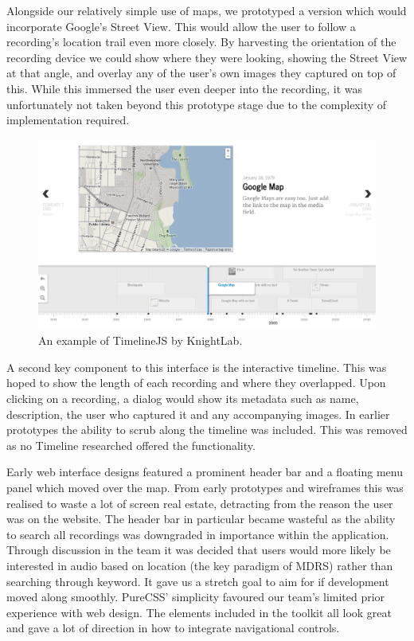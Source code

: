 \documentclass{l3proj}
\begin{document}
Alongside our relatively simple use of maps, we prototyped a version which would incorporate Google's Street View. This would allow the user to follow a recording's location trail even more closely. By harvesting the orientation of the recording device we could show where they were looking, showing the Street View at that angle, and overlay any of the user's own images they captured on top of this. While this immersed the user even deeper into the recording, it was unfortunately not taken beyond this prototype stage due to the complexity of implementation required.

\begin{figure}[ht!]
\centering
\includegraphics[width=1\textwidth]{images/timeline-example.png}
\caption{An example of TimelineJS by KnightLab.}
\end{figure}

A second key component to this interface is the interactive timeline. This was hoped to show the length of each recording and where they overlapped. Upon clicking on a recording, a dialog would show its metadata such as name, description, the user who captured it and any accompanying images. In earlier prototypes the ability to scrub along the timeline was included. This was removed as no Timeline researched offered the functionality.

Early web interface designs featured a prominent header bar and a floating menu panel which moved over the map. From early prototypes and wireframes this was realised to waste a lot of screen real estate, detracting from the reason the user was on the website. The header bar in particular became wasteful as the ability to search all recordings was downgraded in importance within the application. Through discussion in the team it was decided that users would more likely be interested in audio based on location (the key paradigm of MDRS) rather than searching through keyword. It gave us a stretch goal to aim for if development moved along smoothly. PureCSS' simplicity favoured our team's limited prior experience with web design. The elements included in the toolkit all look great and gave a lot of direction in how to integrate navigational controls.
\end{document}
